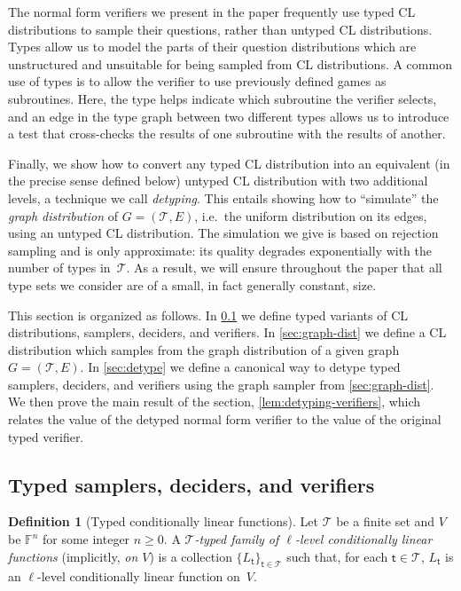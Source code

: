 \documentclass[11pt]{article}
\theoremstyle{definition}
\newtheorem{definition}[theorem]{Definition}
\newcommand{\F}{\ensuremath{\mathbb{F}}}
\newcommand{\type}{\mathcal{T}}
\newcommand{\tvarstyle}[1]{\mathsf{#1}}
\newcommand{\tvar}{\ensuremath{\tvarstyle{t}}}
\begin{document}
The normal form verifiers we present in the paper frequently use typed CL
distributions to sample their questions, rather than untyped CL distributions.
Types allow us to model the parts of their question distributions which are
unstructured and unsuitable for being sampled from CL distributions.
A common use of types is to allow the verifier to use previously defined games
as subroutines.
Here, the type helps indicate which subroutine the verifier selects, and an edge
in the type graph between two different types allows us to introduce a test that
cross-checks the results of one subroutine with the results of another.

Finally, we show how to convert any typed CL distribution into an equivalent (in
the precise sense defined below) untyped CL distribution with two additional
levels, a technique we call \emph{detyping}.
This entails showing how to ``simulate'' the \emph{graph distribution} of $G =
(\type, E)$, i.e.\ the uniform distribution on its edges, using an untyped CL
distribution.
The simulation we give is based on rejection sampling and is only approximate:
its quality degrades exponentially with the number of types in~$\type$.
As a result, we will ensure throughout the paper that all type sets we consider
are of a small, in fact generally constant, size.

This section is organized as follows.
In \cref{sec:typed-samplers} we define typed variants of CL distributions,
samplers, deciders, and verifiers.
In \cref{sec:graph-dist} we define a CL distribution which samples from the
graph distribution of a given graph $G = (\type, E)$.
In \cref{sec:detype} we define a canonical way to detype typed samplers,
deciders, and verifiers using the graph sampler from \cref{sec:graph-dist}.
We then prove the main result of the section, \cref{lem:detyping-verifiers},
which relates the value of the detyped normal form verifier to the value of
the original typed verifier.

\subsection{Typed samplers, deciders, and verifiers}
\label{sec:typed-samplers}

\begin{definition}[Typed conditionally linear functions]
  Let $\type$ be a finite set and $V$ be $\F^n$ for some integer $n \geq 0$.
  A \emph{$\type$-typed family of $\ell$-level conditionally linear functions}
  (implicitly, \emph{on $V$}) is a collection $\{L_\tvar\}_{\tvar \in \type}$
  such that, for each $\tvar \in \type$, $L_\tvar$ is an $\ell$-level
  conditionally linear function on~$V$.
\end{definition}
\end{document}
